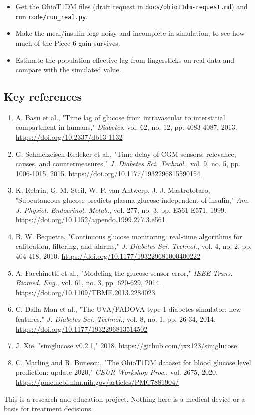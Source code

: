 \documentclass[11pt,a4paper]{article}
\providecommand{\tightlist}{\setlength{\itemsep}{0pt}\setlength{\parskip}{0pt}}
\begin{document}
\begin{itemize}
\tightlist
\item
  Get the OhioT1DM files (draft request in
  \texttt{docs/ohiot1dm-request.md}) and run \texttt{code/run\_real.py}.
\item
  Make the meal/insulin logs noisy and incomplete in simulation, to see
  how much of the Piece 6 gain survives.
\item
  Estimate the population effective lag from fingersticks on real data
  and compare with the simulated value.
\end{itemize}

\hypertarget{key-references}{%
\subsection{Key references}\label{key-references}}

\begin{enumerate}
\def\labelenumi{\arabic{enumi}.}
\tightlist
\item
  A. Basu et al., "Time lag of glucose from intravascular to
  interstitial compartment in humans," \emph{Diabetes}, vol. 62, no. 12,
  pp. 4083-4087, 2013. \url{https://doi.org/10.2337/db13-1132}
\item
  G. Schmelzeisen-Redeker et al., "Time delay of CGM sensors: relevance,
  causes, and countermeasures," \emph{J. Diabetes Sci. Technol.}, vol.
  9, no. 5, pp. 1006-1015, 2015.
  \url{https://doi.org/10.1177/1932296815590154}
\item
  K. Rebrin, G. M. Steil, W. P. van Antwerp, J. J. Mastrototaro,
  "Subcutaneous glucose predicts plasma glucose independent of insulin,"
  \emph{Am. J. Physiol. Endocrinol. Metab.}, vol. 277, no. 3, pp.
  E561-E571, 1999. \url{https://doi.org/10.1152/ajpendo.1999.277.3.e561}
\item
  B. W. Bequette, "Continuous glucose monitoring: real-time algorithms
  for calibration, filtering, and alarms," \emph{J. Diabetes Sci.
  Technol.}, vol. 4, no. 2, pp. 404-418, 2010.
  \url{https://doi.org/10.1177/193229681000400222}
\item
  A. Facchinetti et al., "Modeling the glucose sensor error," \emph{IEEE
  Trans. Biomed. Eng.}, vol. 61, no. 3, pp. 620-629, 2014.
  \url{https://doi.org/10.1109/TBME.2013.2284023}
\item
  C. Dalla Man et al., "The UVA/PADOVA type 1 diabetes simulator: new
  features," \emph{J. Diabetes Sci. Technol.}, vol. 8, no. 1, pp. 26-34,
  2014. \url{https://doi.org/10.1177/1932296813514502}
\item
  J. Xie, "simglucose v0.2.1," 2018.
  \url{https://github.com/jxx123/simglucose}
\item
  C. Marling and R. Bunescu, "The OhioT1DM dataset for blood glucose
  level prediction: update 2020," \emph{CEUR Workshop Proc.}, vol. 2675,
  2020. \url{https://pmc.ncbi.nlm.nih.gov/articles/PMC7881904/}
\end{enumerate}

This is a research and education project. Nothing here is a medical
device or a basis for treatment decisions.
\end{document}
